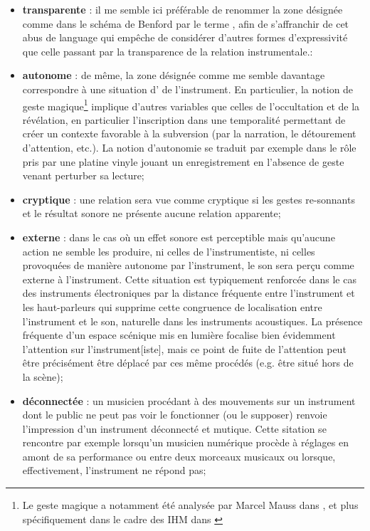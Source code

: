 \begin{itemize}[noitemsep]
	\item \textbf{transparente} : il me semble ici préférable de renommer la zone désignée comme  dans le schéma de Benford par le terme , afin de s'affranchir de cet abus de language qui empêche de considérer d'autres formes d'expressivité que celle passant par la transparence de la relation instrumentale.:
	\item \textbf{autonome} : de même, la zone désignée comme  me semble davantage correspondre à une situation d' de l'instrument. En particulier, la notion de geste magique\footnote{Le geste magique a notamment été analysée par Marcel Mauss dans \cite{mauss_esquisse_1902}, et plus spécifiquement dans le cadre des \gls{IHM} dans \cite{lokuge_dynamic_1995, marshall_deception_2010}} implique d'autres variables que celles de l'occultation et de la révélation, en particulier l'inscription dans une temporalité permettant de créer un contexte favorable à la subversion (par la narration, le détourement d'attention, etc.). La notion d'autonomie se traduit par exemple dans le rôle pris par une platine vinyle jouant un enregistrement en l'absence de geste venant perturber sa lecture;
	\item \textbf{cryptique} : une relation sera vue comme cryptique si les gestes re-sonnants et le résultat sonore ne présente aucune relation apparente;
	\item \textbf{externe} : dans le cas où un effet sonore est perceptible mais qu'aucune action ne semble les produire, ni celles de l'instrumentiste, ni celles provoquées de manière autonome par l'instrument, le son sera perçu comme externe à l'instrument. Cette situation est typiquement renforcée dans le cas des instruments électroniques par la distance fréquente entre l'instrument et les haut-parleurs qui supprime cette congruence de localisation entre l'instrument et le son, naturelle dans les instruments acoustiques. La présence fréquente d'un espace scénique mis en lumière focalise bien évidemment l'attention sur l'instrument[iste], mais ce point de fuite de l'attention peut être précisément être déplacé par ces même procédés (e.g. être situé hors de la scène);
	\item \textbf{déconnectée} : un musicien procédant à des mouvements sur un instrument dont le public ne peut pas voir le fonctionner (ou le supposer) renvoie l'impression d'un instrument déconnecté et mutique. Cette sitation se rencontre par exemple lorsqu'un musicien numérique procède à réglages en amont de sa performance ou entre deux morceaux musicaux ou lorsque, effectivement, l'instrument ne répond pas;

\end{itemize}

